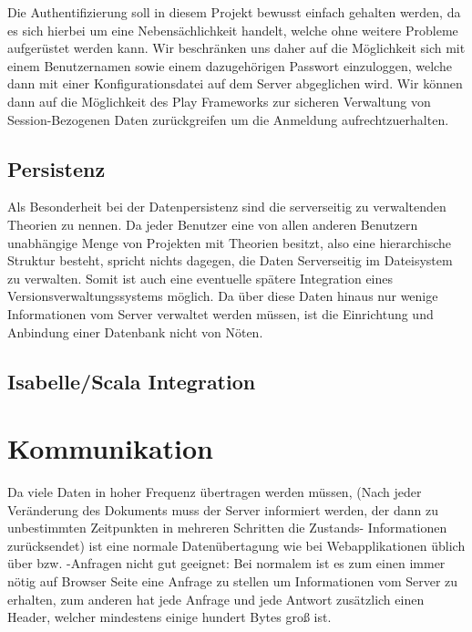 Die Authentifizierung soll in diesem Projekt bewusst einfach gehalten werden, da es sich hierbei um
eine Nebensächlichkeit handelt, welche ohne weitere Probleme aufgerüstet werden kann. Wir
beschränken uns daher auf die Möglichkeit sich mit einem Benutzernamen sowie einem dazugehörigen
Passwort einzuloggen, welche dann mit einer Konfigurationsdatei auf dem Server abgeglichen wird. Wir
können dann auf die Möglichkeit des Play Frameworks zur sicheren Verwaltung von Session-Bezogenen
Daten zurückgreifen um die Anmeldung aufrechtzuerhalten.

\subsection{Persistenz}

Als Besonderheit bei der Datenpersistenz sind die serverseitig zu verwaltenden Theorien zu nennen.
Da jeder Benutzer eine von allen anderen Benutzern unabhängige Menge von Projekten mit Theorien
besitzt, also eine hierarchische Struktur besteht, spricht nichts dagegen, die Daten Serverseitig im
Dateisystem zu verwalten. Somit ist auch eine eventuelle spätere Integration eines
Versionsverwaltungssystems möglich. Da über diese Daten hinaus nur wenige Informationen vom Server
verwaltet werden müssen, ist die Einrichtung und Anbindung einer Datenbank nicht von Nöten.

\subsection{Isabelle/Scala Integration}



\section{Kommunikation}

Da viele Daten in hoher Frequenz übertragen werden müssen, (Nach jeder Veränderung des Dokuments
muss der Server informiert werden, der dann zu unbestimmten Zeitpunkten in mehreren Schritten die
Zustands- Informationen zurücksendet) ist eine normale Datenübertagung wie bei Webapplikationen
üblich über  bzw. -Anfragen nicht gut geeignet: Bei normalem  ist es
zum einen immer nötig auf Browser Seite eine Anfrage zu stellen um Informationen vom Server zu
erhalten, zum anderen hat jede Anfrage und jede Antwort zusätzlich einen Header, welcher mindestens
einige hundert Bytes groß ist. 

